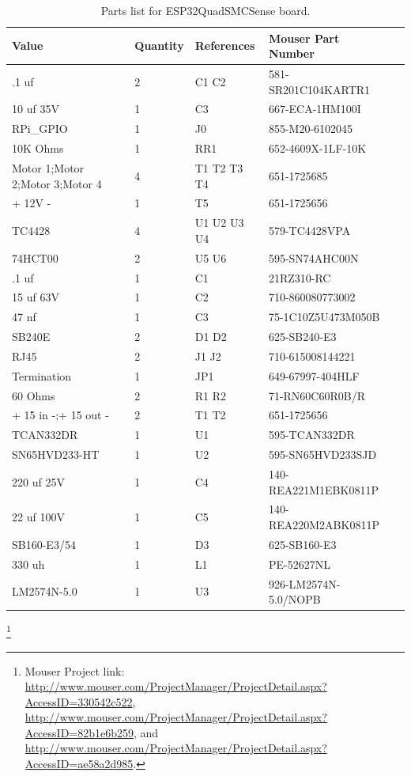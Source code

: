 \begin{table}[htp]
\begin{centering}\begin{tabular}{|l|l|p{1in}|l|p{.5in}|}
\hline
Value&Quantity&References&Mouser Part Number \\
\hline
.1 uf&2&C1 C2&581-SR201C104KARTR1 \\
\hline
10 uf 35V&1&C3&667-ECA-1HM100I \\
\hline
RPi\_GPIO&1&J0&855-M20-6102045 \\
\hline
10K Ohms&1&RR1&652-4609X-1LF-10K \\
\hline
Motor 1;Motor 2;Motor 3;Motor 4&4&T1 T2 T3 T4&651-1725685 \\
\hline
+ 12V -&1&T5&651-1725656 \\
\hline
TC4428&4&U1 U2 U3 U4&579-TC4428VPA \\
\hline
74HCT00&2&U5 U6&595-SN74AHC00N \\
\hline
.1 uf&1&C1&21RZ310-RC\\
\hline
15 uf 63V&1&C2&710-860080773002\\
\hline
47 nf&1&C3&75-1C10Z5U473M050B\\
\hline
SB240E&2&D1 D2&625-SB240-E3\\
\hline
RJ45&2&J1 J2&710-615008144221\\
\hline
Termination&1&JP1&649-67997-404HLF\\
\hline
60 Ohms&2&R1 R2&71-RN60C60R0B/R\\
\hline
+ 15 in -;+ 15 out -&2&T1 T2&651-1725656\\
\hline
TCAN332DR&1&U1&595-TCAN332DR\\
\hline
SN65HVD233-HT&1&U2&595-SN65HVD233SJD\\
\hline
220 uf 25V&1&C4&140-REA221M1EBK0811P\\
\hline
22 uf 100V&1&C5&140-REA220M2ABK0811P\\
\hline
SB160-E3/54&1&D3&625-SB160-E3\\
\hline
330 uh&1&L1&PE-52627NL\\
\hline
LM2574N-5.0&1&U3&926-LM2574N-5.0/NOPB\\
\hline
\end{tabular}
\caption{Parts list for ESP32QuadSMCSense board.}
\end{centering}\end{table}\footnote{Mouser Project link: 
\url{http://www.mouser.com/ProjectManager/ProjectDetail.aspx?AccessID=330542c522},
\url{http://www.mouser.com/ProjectManager/ProjectDetail.aspx?AccessID=82b1e6b259}, and
\url{http://www.mouser.com/ProjectManager/ProjectDetail.aspx?AccessID=ae58a2d985}.}


